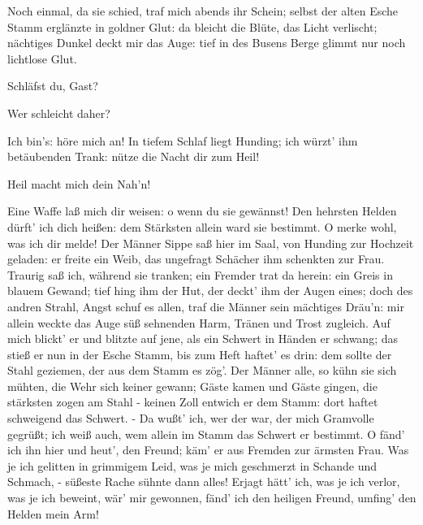 \begin{drama}
Noch einmal, da sie schied,
traf mich abends ihr Schein;
selbst der alten Esche Stamm
erglänzte in goldner Glut:
da bleicht die Blüte, das Licht verlischt;
nächtiges Dunkel deckt mir das Auge:
tief in des Busens Berge glimmt nur noch lichtlose Glut.
 



\Sieglindespeaks
Schläfst du, Gast?
 

\Siegmundspeaks


Wer schleicht daher?
 

\Sieglindespeaks


Ich bin's: höre mich an!
In tiefem Schlaf liegt Hunding;
ich würzt' ihm betäubenden Trank:
nütze die Nacht dir zum Heil!
 

\Siegmundspeaks


Heil macht mich dein Nah'n!
 

\Sieglindespeaks
Eine Waffe laß mich dir weisen: o wenn du sie gewännst!
Den hehrsten Helden dürft' ich dich heißen:
dem Stärksten allein ward sie bestimmt.
O merke wohl, was ich dir melde!
Der Männer Sippe saß hier im Saal,
von Hunding zur Hochzeit geladen:
er freite ein Weib,
das ungefragt Schächer ihm schenkten zur Frau.
Traurig saß ich, während sie tranken;
ein Fremder trat da herein:
ein Greis in blauem Gewand;
tief hing ihm der Hut,
der deckt' ihm der Augen eines;
doch des andren Strahl, Angst schuf es allen,
traf die Männer sein mächtiges Dräu'n:
mir allein weckte das Auge
süß sehnenden Harm,
Tränen und Trost zugleich.
Auf mich blickt' er und blitzte auf jene,
als ein Schwert in Händen er schwang;
das stieß er nun in der Esche Stamm,
bis zum Heft haftet' es drin:
dem sollte der Stahl geziemen,
der aus dem Stamm es zög'.
Der Männer alle, so kühn sie sich mühten,
die Wehr sich keiner gewann;
Gäste kamen und Gäste gingen,
die stärksten zogen am Stahl -
keinen Zoll entwich er dem Stamm:
dort haftet schweigend das Schwert. -
Da wußt' ich, wer der war,
der mich Gramvolle gegrüßt; ich weiß auch,
wem allein im Stamm das Schwert er bestimmt.
O fänd' ich ihn hier und heut', den Freund;
käm' er aus Fremden zur ärmsten Frau.
Was je ich gelitten in grimmigem Leid,
was je mich geschmerzt in Schande und Schmach, -
süßeste Rache sühnte dann alles!
Erjagt hätt' ich, was je ich verlor,
was je ich beweint, wär' mir gewonnen,
fänd' ich den heiligen Freund,
umfing' den Helden mein Arm!
 


\end{drama}
